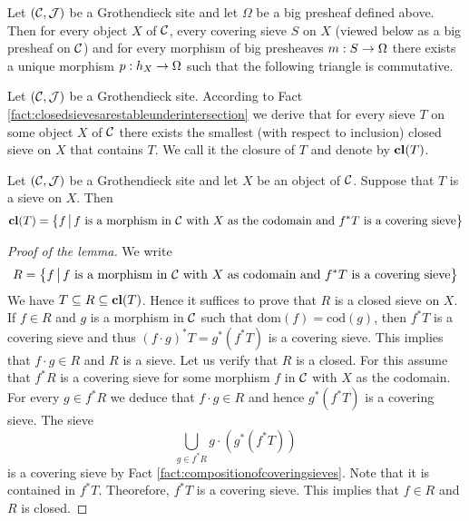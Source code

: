 \begin{theorem}\label{theorem:subobjectclassifierissheaf}
Let $({\mathcal C},{\mathcal J})$ be a Grothendieck site and let $\Omega$ be a big presheaf defined above. Then for every object $X$ of ${\mathcal C}$, every covering sieve $S$ on $X$ (viewed below as a big presheaf on ${\mathcal C}$) and for every morphism of big presheaves $m:S\rightarrow \Omega$ there exists a unique morphism $p:h_X\rightarrow \Omega$ such that the following triangle is commutative.
\begin{center}
\end{center}
\end{theorem}
\noindent
Let $({\mathcal C},{\mathcal J})$ be a Grothendieck site. According to Fact \ref{fact:closedsievesarestableunderintersection} we derive that for every sieve $T$ on some object $X$ of ${\mathcal C}$ there exists the smallest (with respect to inclusion) closed sieve on $X$ that contains $T$. We call it the closure of $T$ and denote by $\mathbf{cl}(T)$.

\begin{lemma}\label{lemma:closuredescribed}
Let $({\mathcal C},{\mathcal J})$ be a Grothendieck site and let $X$ be an object of ${\mathcal C}$. Suppose that $T$ is a sieve on $X$. Then
$$\mathbf{cl}(T) = \big\{f\,\big|\,f\mbox{ is a morphism in }{\mathcal C}\mbox{ with }X\mbox{ as the codomain and }f^*T\mbox{ is a covering sieve}\big\}$$
\end{lemma}
\begin{proof}[Proof of the lemma]
We write
$$R = \big\{f\,\big|\,f\mbox{ is a morphism in }{\mathcal C}\mbox{ with }X\mbox{ as codomain and }f^*T\mbox{ is a covering sieve}\big\}$$
We have $T\subseteq R\subseteq \mathbf{cl}(T)$. Hence it suffices to prove that $R$ is a closed sieve on $X$. If $f\in R$ and $g$ is a morphism in ${\mathcal C}$ such that $\mathrm{dom}(f) = \mathrm{cod}(g)$, then $f^*T$ is a covering sieve and thus $(f\cdot g)^*T = g^*\left(f^*T\right)$ is a covering sieve. This implies that $f\cdot g\in R$ and $R$ is a sieve. Let us verify that $R$ is a closed. For this assume that $f^*R$ is a covering sieve for some morphism $f$ in ${\mathcal C}$ with $X$ as the codomain. For every $g\in f^*R$ we deduce that $f\cdot g\in R$ and hence $g^*\left(f^*T\right)$ is a covering sieve. The sieve
$$\bigcup_{g\in f^*R}g\cdot \left(g^*\left(f^*T\right)\right)$$
is a covering sieve by Fact \ref{fact:compositionofcoveringsieves}. Note that it is contained in $f^*T$. Theorefore, $f^*T$ is a covering sieve. This implies that $f\in R$ and $R$ is closed.
\end{proof}

